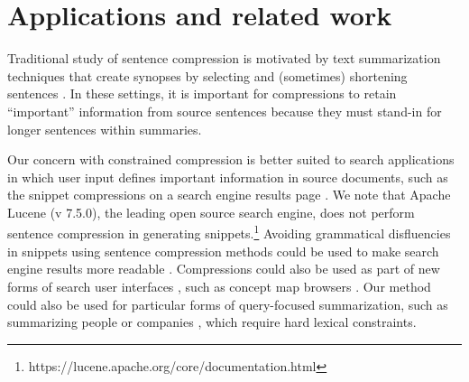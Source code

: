 \documentclass[11pt,a4paper]{article}
\newcommand{\ahcomment}[1]{\textcolor{blue}{[#1 -AH]}}
\begin{document}

\section{Applications and related work}

Traditional study of sentence compression is motivated by text summarization techniques that create synopses by selecting and (sometimes) shortening sentences \cite{Knight2000StatisticsBasedS,vanderwende2007beyond,martins2009summarization}. 
In these settings, it is important for compressions to retain ``important'' information from source sentences because they must stand-in for longer sentences within summaries.

Our concern with constrained compression is better suited to search applications in which user input defines important information in source documents, such as the snippet compressions on a search engine results page \cite{tombros1998advantages,Metzler2008MachineLS}. %
We note that Apache Lucene {\small (v 7.5.0)}, the leading open source search engine, does not perform sentence compression in generating snippets.\footnote{https://lucene.apache.org/core/documentation.html} Avoiding grammatical disfluencies in snippets using sentence compression methods could be used to make search engine results more readable \cite{kanungo2009predicting}. Compressions could also be used as part of new forms of search user interfaces \cite{hearst2009search}, such as concept map browsers \cite{falke2017graphdocexplore}. Our method could also be used for particular forms of query-focused summarization, such as summarizing people \cite{w04} or companies \cite{filippova2009company}, which require hard lexical constraints. 
\end{document}
